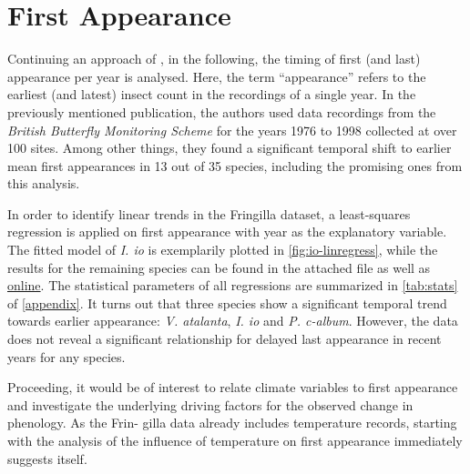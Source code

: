 \section{First Appearance}

Continuing an approach of \textcite{roy2000}, in the following, the timing of first (and last) appearance per year is analysed. Here, the term \enquote{appearance} refers to the earliest (and latest) insect count in the recordings of a single year. In the previously mentioned publication, the authors used data recordings from the \textit{British Butterfly Monitoring Scheme} for the years 1976 to 1998 collected at over 100 sites. Among other things, they found a significant temporal shift to earlier mean first appearances in 13 out of 35 species, including the promising ones from this analysis.

In order to identify linear trends in the Fringilla dataset, a least-squares regression is applied on first appearance with year as the explanatory variable. The fitted model of \textit{I. io} is exemplarily plotted in \cref{fig:io-linregress}, while the results for the remaining species can be found in the attached file as well as \href{https://github.com/gtlab-barcelona/Robert/tree/main/data-exploration_first-last/figs/first-last-day_1998-2020/species}{online}. The statistical parameters of all regressions are summarized in \cref{tab:stats} of \cref{appendix}. It turns out that three species show a significant temporal trend towards earlier appearance: \textit{V. atalanta}, \textit{I. io} and \textit{P. c-album}. However, the data does not reveal a significant relationship for delayed last appearance in recent years for any species.

Proceeding, it would be of interest to relate climate variables to first appearance and investigate the underlying driving factors for the observed change in phenology.
As the Frin- \linebreak gilla data already includes temperature records, starting with the analysis of the influence of temperature on first appearance immediately suggests itself.


